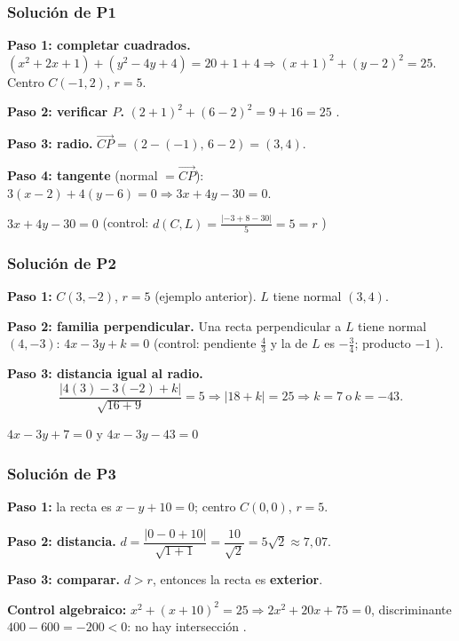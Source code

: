 \documentclass[11pt,a4paper]{article}
\theoremstyle{ej}
\begin{document}
\subsubsection*{Solución de P1}
\textbf{Paso 1: completar cuadrados.}
$(x^2+2x+1)+(y^2-4y+4)=20+1+4\Rightarrow(x+1)^2+(y-2)^2=25$. Centro $C(-1,2)$, $r=5$.

\textbf{Paso 2: verificar $P$.} $(2+1)^2+(6-2)^2=9+16=25$ \checkmark.

\textbf{Paso 3: radio.} $\overrightarrow{CP}=(2-(-1),\,6-2)=(3,4)$.

\textbf{Paso 4: tangente} (normal $=\overrightarrow{CP}$): $3(x-2)+4(y-6)=0\Rightarrow3x+4y-30=0$.

\begin{respuesta}$3x+4y-30=0$ \quad (control: $d(C,L)=\frac{|-3+8-30|}{5}=5=r$ \checkmark)\end{respuesta}

\subsubsection*{Solución de P2}
\textbf{Paso 1:} $C(3,-2)$, $r=5$ (ejemplo anterior). $L$ tiene normal $(3,4)$.

\textbf{Paso 2: familia perpendicular.} Una recta perpendicular a $L$ tiene normal $(4,-3)$:
$4x-3y+k=0$ (control: pendiente $\frac43$ y la de $L$ es $-\frac34$; producto $-1$ \checkmark).

\textbf{Paso 3: distancia igual al radio.}
\[ \frac{|4(3)-3(-2)+k|}{\sqrt{16+9}}=5\Rightarrow|18+k|=25\Rightarrow k=7\ \text{o}\ k=-43. \]
\begin{respuesta}$4x-3y+7=0$ \quad y \quad $4x-3y-43=0$\end{respuesta}

\subsubsection*{Solución de P3}
\textbf{Paso 1:} la recta es $x-y+10=0$; centro $C(0,0)$, $r=5$.

\textbf{Paso 2: distancia.} $d=\dfrac{|0-0+10|}{\sqrt{1+1}}=\dfrac{10}{\sqrt2}=5\sqrt2\approx7{,}07$.

\textbf{Paso 3: comparar.} $d>r$, entonces la recta es \textbf{exterior}.

\textbf{Control algebraico:} $x^2+(x+10)^2=25\Rightarrow2x^2+20x+75=0$, discriminante $400-600=-200<0$: no hay intersección \checkmark.

\newpage
\end{document}
